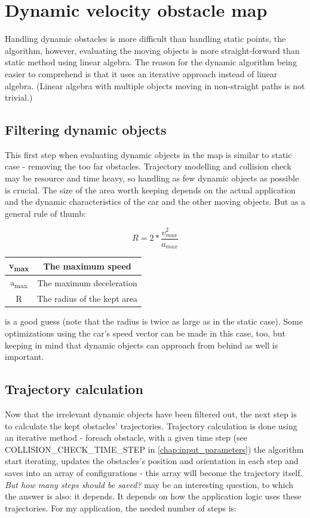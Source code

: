 \section{Dynamic velocity obstacle map}
\label{chap:dynamic_velocity_obstacle_map}
Handling dynamic obstacles is more difficult than handling static points, the algorithm, however, evaluating the moving objects is more straight-forward than static method using linear algebra. The reason for the dynamic algorithm being easier to comprehend is that it uses an iterative approach instead of linear algebra. (Linear algebra with multiple objects moving in non-straight paths is not trivial.)

\subsection{Filtering dynamic objects}
This first step when evaluating dynamic objects in the map is similar to static case - removing the too far obstacles. Trajectory modelling and collision check may be  resource and time heavy, so handling as few dynamic objects as possible is crucial. The size of the area worth keeping depends on the actual application and the dynamic characteristics of the car and the other moving objects. But as a general rule of thumb:

\[ R = 2 * \frac{v_{max}^2}{a_{max}} \]

\begin{center}
    \begin{tabular}{ | c | c | }
        \hline
        v\textsubscript{max}	& The maximum speed    			\\
        \hline
        a\textsubscript{max}  	& The maximum deceleration      \\
        \hline
        R  						& The radius of the kept area	\\
        \hline
    \end{tabular}
\end{center}

is a good guess (note that the radius is twice as large as in the static case). Some optimizations using the car's speed vector can be made in this case, too, but keeping in mind that dynamic objects can approach from behind as well is important.

\subsection{Trajectory calculation}
\label{trajectory_calculation}
Now that the irrelevant dynamic objects have been filtered out, the next step is to calculate the kept obstacles' trajectories. Trajectory calculation is done using an iterative method - foreach obstacle, with a given time step (see COLLISION\_CHECK\_TIME\_STEP in \ref{chap:input_parameters}) the algorithm start iterating, updates the obstacles's position and orientation in each step and saves into an array of configurations - this array will become the trajectory itself. \textit{But how many steps should be saved?} may be an interesting question, to which the answer is also: it depends. It depends on how the application logic uses these trajectories. For my application, the needed number of steps is:

